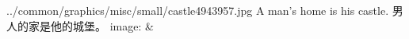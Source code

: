 ﻿%













\bannerProverb
\proverbnh
  {../common/graphics/misc/small/castle4943957.jpg}
  {A man's home is his castle.}
  {男人的家是他的城堡。}
  {image: & 
  }
\\
\bannerVocabulary
